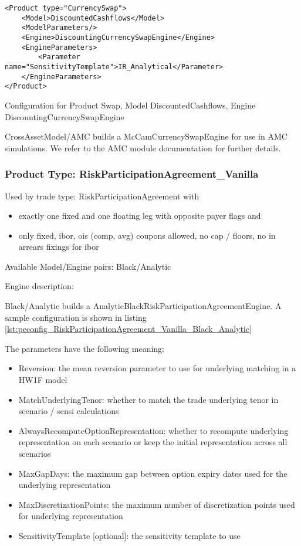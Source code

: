 \begin{longlisting}
\begin{verbatim}
<Product type="CurrencySwap">
    <Model>DiscountedCashflows</Model>
    <ModelParameters/>
    <Engine>DiscountingCurrencySwapEngine</Engine>
    <EngineParameters>
        <Parameter name="SensitivityTemplate">IR_Analytical</Parameter>
    </EngineParameters>
</Product>
\end{verbatim}
\caption{Configuration for Product Swap, Model DiscountedCashflows, Engine DiscountingCurrencySwapEngine}
\label{lst:peconfig_Swap_DiscountedCashflows_DiscountingCurrencySwapEngine}
\end{longlisting}

CrossAssetModel/AMC builds a McCamCurrencySwapEngine for use in AMC simulations. We refer to the AMC module
documentation for further details.

\subsubsection{Product Type: RiskParticipationAgreement\_Vanilla}

Used by trade type: RiskParticipationAgreement with

\begin{itemize}
\item exactly one fixed and one floating leg with opposite payer flags and
\item only fixed, ibor, ois (comp, avg) coupons allowed, no cap / floors, no in arrears fixings for ibor
\end{itemize}

Available Model/Engine pairs: Black/Analytic

Engine description:

Black/Analytic builds a AnalyticBlackRiskParticipationAgreementEngine. A sample configuration is shown in listing
\ref{lst:peconfig_RiskParticipationAgreement_Vanilla_Black_Analytic}

The parameters have the following meaning:

\begin{itemize}
\item Reversion: the mean reversion parameter to use for underlying matching in a HW1F model
\item MatchUnderlyingTenor: whether to match the trade underlying tenor in scenario / sensi calculations
\item AlwaysRecomputeOptionRepresentation: whether to recompute underlying representation on each scenario or keep the initial representation across all scenarios
\item MaxGapDays: the maximum gap between option expiry dates used for the underlying representation
\item MaxDiscretizationPoints: the maximum number of discretization points used for underlying representation
\item SensitivityTemplate [optional]: the sensitivity template to use 
\end{itemize}

